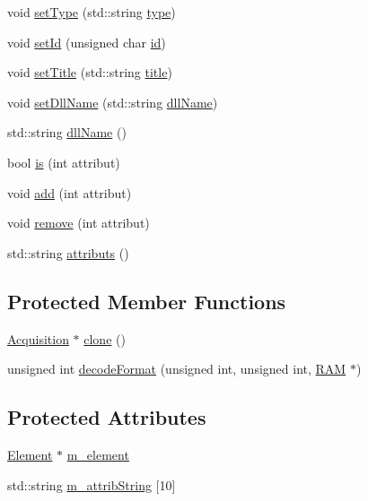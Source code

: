 \begin{DoxyCompactItemize}
void \hyperlink{classObject_aae534cc9d982bcb9b99fd505f2e103a5}{set\+Type} (std\+::string \hyperlink{classObject_a84f99f70f144a83e1582d1d0f84e4e62}{type})
\item 
void \hyperlink{classObject_a398fe08cba594a0ce6891d59fe4f159f}{set\+Id} (unsigned char \hyperlink{classObject_af99145335cc61ff6e2798ea17db009d2}{id})
\item 
void \hyperlink{classObject_a89557dbbad5bcaa02652f5d7fa35d20f}{set\+Title} (std\+::string \hyperlink{classObject_a73a0f1a41828fdd8303dd662446fb6c3}{title})
\item 
void \hyperlink{classObject_a870c5af919958c2136623b2d7816d123}{set\+Dll\+Name} (std\+::string \hyperlink{classObject_a2e3947f2870094c332d7454117f3ec63}{dll\+Name})
\item 
std\+::string \hyperlink{classObject_a2e3947f2870094c332d7454117f3ec63}{dll\+Name} ()
\item 
bool \hyperlink{classAttrib_a704f26af560909ad22065083bb7d4c34}{is} (int attribut)
\item 
void \hyperlink{classAttrib_a235f773af19c900264a190b00a3b4ad7}{add} (int attribut)
\item 
void \hyperlink{classAttrib_a7d4ef7e32d93cb287792b87b857e79f3}{remove} (int attribut)
\item 
std\+::string \hyperlink{classAttrib_aee7bbf16b144887f196e1341b24f8a26}{attributs} ()
\end{DoxyCompactItemize}
\subsection*{Protected Member Functions}
\begin{DoxyCompactItemize}
\item 
\hyperlink{classAcquisition_1_1Acquisition}{Acquisition} $\ast$ \hyperlink{classAcquisition_a4b1b690ef27f20b3e1ad9383f2f57628}{clone} ()
\item 
unsigned int \hyperlink{classAcquisition_a76fe7c020f7097e5d479867ba783ba31}{decode\+Format} (unsigned int, unsigned int, \hyperlink{classRAM}{R\+AM} $\ast$)
\end{DoxyCompactItemize}
\subsection*{Protected Attributes}
\begin{DoxyCompactItemize}
\item 
\hyperlink{classElement}{Element} $\ast$ \hyperlink{classProcessus_aa9d24d53c3e52f36786cabb5d8e296e7}{m\+\_\+element}
\item 
std\+::string \hyperlink{classAttrib_a3414521d7a82476e874b25a5407b5e63}{m\+\_\+attrib\+String} \mbox{[}10\mbox{]}
\end{DoxyCompactItemize}
